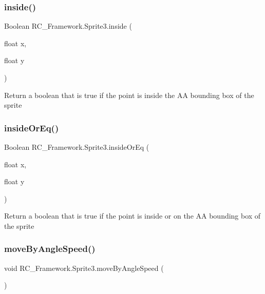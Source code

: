 \subsubsection{\texorpdfstring{inside()}{inside()}}
{\footnotesize\ttfamily Boolean R\+C\+\_\+\+Framework.\+Sprite3.\+inside (\begin{DoxyParamCaption}\item[{float}]{x,  }\item[{float}]{y }\end{DoxyParamCaption})}



Return a boolean that is true if the point is inside the AA bounding box of the sprite

\mbox{\label{class_r_c___framework_1_1_sprite3_abdaf66e3a0bcc82d446a2c3f059c3fba}} 
\subsubsection{\texorpdfstring{inside\+Or\+Eq()}{insideOrEq()}}
{\footnotesize\ttfamily Boolean R\+C\+\_\+\+Framework.\+Sprite3.\+inside\+Or\+Eq (\begin{DoxyParamCaption}\item[{float}]{x,  }\item[{float}]{y }\end{DoxyParamCaption})}



Return a boolean that is true if the point is inside or on the AA bounding box of the sprite

\mbox{\label{class_r_c___framework_1_1_sprite3_a8566054426bf9eb7093c101a2c26407e}} 
\subsubsection{\texorpdfstring{move\+By\+Angle\+Speed()}{moveByAngleSpeed()}}
{\footnotesize\ttfamily void R\+C\+\_\+\+Framework.\+Sprite3.\+move\+By\+Angle\+Speed (\begin{DoxyParamCaption}{ }\end{DoxyParamCaption})}



